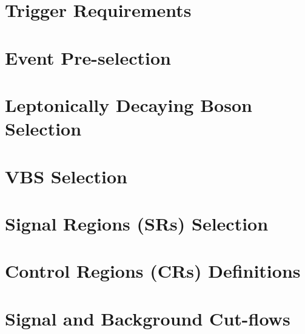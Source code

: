\section{Trigger Requirements}

\clearpage
\section{Event Pre-selection}

\clearpage
\section{Leptonically Decaying Boson Selection}

\clearpage
\section{VBS Selection}

\clearpage
\section{Signal Regions (SRs) Selection}

\clearpage
\section{Control Regions (CRs) Definitions}

\clearpage
\section{Signal and Background Cut-flows}

